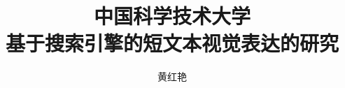 \documentclass[bachelor,fontset=windowsold]{ustcthesis}
\title{中国科学技术大学\\基于搜索引擎的短文本视觉表达的研究}
\author{黄红艳}
\begin{document}
\maketitle

%
%
%

\frontmatter

\tableofcontents


\listoffigures
\listoftables
\listofalgorithms  %
% 

\mainmatter







%

%
%
%
%
%
%
%

\appendix

\backmatter
%
%
\end{document}
